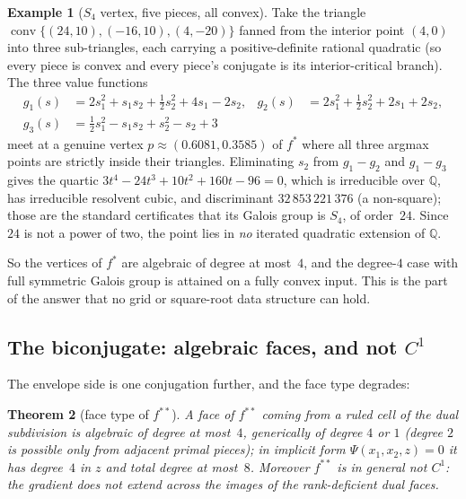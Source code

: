 \documentclass[11pt]{article}
\newtheorem{theorem}{Theorem}
\theoremstyle{definition}
\newtheorem{example}[theorem]{Example}
\newcommand{\Q}{\mathbb{Q}}
\begin{document}
\begin{example}[$S_4$ vertex, five pieces, all convex]\label{ex:s4}
Take the triangle $\operatorname{conv}\{(24,10),(-16,10),(4,-20)\}$ fanned
from the interior point $(4,0)$ into three sub-triangles, each carrying a
positive-definite rational quadratic (so every piece is convex and every piece's
conjugate is its interior-critical branch). The three value functions
\[
\begin{aligned}
g_1(s)&= 2s_1^2+s_1s_2+\tfrac12 s_2^2+4s_1-2s_2, &
g_2(s)&= 2s_1^2+\tfrac12 s_2^2+2s_1+2s_2,\\
g_3(s)&= \tfrac12 s_1^2-s_1s_2+s_2^2-s_2+3
\end{aligned}
\]
meet at a genuine vertex $p\approx(0.6081,0.3585)$ of $f^*$ where all three
argmax points are strictly inside their triangles.
 Eliminating $s_2$
from $g_1-g_2$ and $g_1-g_3$ gives the quartic
$3t^4-24t^3+10t^2+160t-96=0$, which is irreducible over $\Q$, has irreducible
resolvent cubic, and discriminant $32\,853\,221\,376$ (a non-square); those are
the standard certificates that its Galois group is $S_4$, of order~$24$.
 Since $24$
is not a power of two, the point lies in \emph{no} iterated quadratic extension
of $\Q$.
\end{example}

So the vertices of $f^*$ are algebraic of degree at most~$4$, and the degree-$4$
case with full symmetric Galois group is attained on a fully convex input. This
is the part of the answer that no grid or square-root data structure can hold.

\subsection{The biconjugate: algebraic faces, and not $C^1$}

The envelope side is one conjugation further, and the face type degrades:

\begin{theorem}[face type of $f^{**}$]\label{thm:biconjface}
A face of $f^{**}$ coming from a ruled cell of the dual subdivision is
\emph{algebraic of degree at most~$4$}, generically of degree $4$ or $1$
(degree $2$ is possible only from adjacent primal pieces); in implicit form
$\Psi(x_1,x_2,z)=0$ it has degree~$4$ in $z$ and total degree at most~$8$.
Moreover $f^{**}$ is in general \emph{not} $C^1$: the gradient does not extend
across the images of the rank-deficient dual faces.
\end{theorem}
\end{document}

